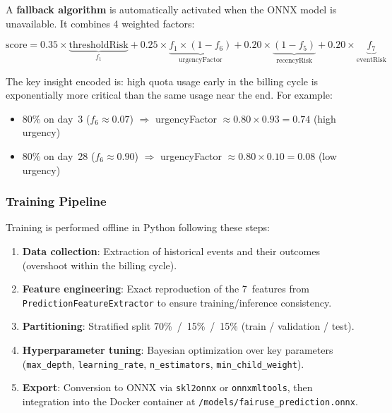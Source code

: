 A \textbf{fallback algorithm} is automatically activated when the ONNX model is unavailable. It combines 4 weighted factors:

\begin{equation}
    \label{eq:fallback}
    \text{score} = 0.35 \times \underbrace{\text{thresholdRisk}}_{f_1}
    + 0.25 \times \underbrace{f_1 \times (1 - f_6)}_{\text{urgencyFactor}}
    + 0.20 \times \underbrace{(1 - f_5)}_{\text{recencyRisk}}
    + 0.20 \times \underbrace{f_7}_{\text{eventRisk}}
\end{equation}

The key insight encoded is: high quota usage early in the billing cycle is exponentially more critical than the same usage near the end. For example:
\begin{itemize}
    \item 80\% on day~3 ($f_6 \approx 0.07$) $\Rightarrow$ urgencyFactor $\approx 0.80 \times 0.93 = 0.74$ (high urgency)
    \item 80\% on day~28 ($f_6 \approx 0.90$) $\Rightarrow$ urgencyFactor $\approx 0.80 \times 0.10 = 0.08$ (low urgency)
\end{itemize}

\subsubsection{Training Pipeline}

Training is performed offline in Python following these steps:

\begin{enumerate}
    \item \textbf{Data collection}: Extraction of historical events and their outcomes (overshoot within the billing cycle).
    \item \textbf{Feature engineering}: Exact reproduction of the 7~features from \texttt{PredictionFeatureExtractor} to ensure training/inference consistency.
    \item \textbf{Partitioning}: Stratified split 70\%~/~15\%~/~15\% (train / validation / test).
    \item \textbf{Hyperparameter tuning}: Bayesian optimization over key parameters (\texttt{max\_depth}, \texttt{learning\_rate}, \texttt{n\_estimators}, \texttt{min\_child\_weight}).
    \item \textbf{Export}: Conversion to ONNX via \texttt{skl2onnx} or \texttt{onnxmltools}, then integration into the Docker container at \texttt{/models/fairuse\_prediction.onnx}.
\end{enumerate}

